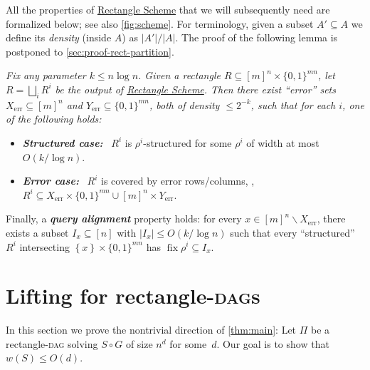 \documentclass{toc}
\newcommand{\rectscheme}{\hyperref[alg:partition]{Rectangle Scheme}\xspace}
\DeclareMathOperator{\fix}{fix}
\DeclareMathOperator{\err}{err}
\newcommand{\DAGs}{\textsc{dag}s\xspace}
\newcommand{\DAGspace}{\textsc{dag}\xspace}
\newcommand{\allX}{[m]^n}
\newcommand{\allY}{\{0,1\}^{mn}}
\newcommand{\set}[1]{\left \{ #1 \right \}}
\begin{document}
All the properties of \rectscheme that we will subsequently need are formalized below; see also \autoref{fig:scheme}. For terminology, given a subset $A'\subseteq A$ we define its \emph{density} (inside $A$) as $|A'|/|A|$. The proof of the following lemma is postponed to \autoref{sec:proof-rect-partition}.

\begin{lemma} \label{lem:scheme}  %
\em Fix any parameter $k \leq n \log n$. Given a rectangle $R\subseteq \allX\times\allY$, let $R=\bigsqcup_i R^i$ be the output of \rectscheme. Then there exist ``error'' sets $X_{\err}\subseteq \allX$ and $Y_{\err}\subseteq\allY$, both of density $\leq 2^{-k}$, such that for each $i$, one of the following holds:
\begin{itemize}[label=$\bullet$,itemsep=1mm]
\item {\bf\slshape Structured case:}~ $R^i$ is $\rho^i$-structured for some $\rho^i$ of width at most $O(k/\log n)$.
\item {\bf\slshape Error case:}~ $R^i$ is covered by error rows/columns, \ie, $R^i\subseteq X_{\err}\times \allY\cup \allX\times Y_{\err}$.
\end{itemize}
Finally, a {\bf\itshape query alignment} property holds: for every $x \in \allX\smallsetminus X_{\err}$, there exists a subset $I_x \subseteq [n]$ with $|I_x| \le O(k/\log n)$ such that every ``structured'' $R^i$ intersecting $\set{x} \times \allY$ has $\fix \rho^i \subseteq I_x$.
\end{lemma}


\section{Lifting for rectangle-\DAGs} \label{sec:proof-rect}

In this section we prove the nontrivial direction of \autoref{thm:main}: Let $\Pi$ be a rectangle-\DAGspace solving $S\circ G$ of size $n^d$ for some~$d$. Our goal is to show that $w(S)\leq O(d)$.
\end{document}
